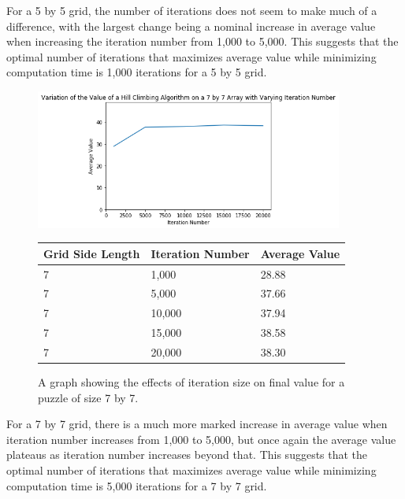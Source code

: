 \documentclass[12pt]{article}
\begin{document}
For a 5 by 5 grid, the number of iterations does not seem to make much of a difference, with the largest change being a nominal increase in average value when increasing the iteration number from 1,000 to 5,000. This suggests that the optimal number of iterations that maximizes average value while minimizing computation time is 1,000 iterations for a 5 by 5 grid.

\begin{figure}[H]
    \centering
    \includegraphics[width=0.9\textwidth]{hill_climbing_7x7_iterations}
\begin{tabular}{ |p{4cm}||p{4cm}|p{4cm}|  }
 \hline
Grid Side Length& Iteration Number &Average Value\\
 \hline
7&1,000&28.88\\
7&5,000&37.66\\
7&10,000&37.94\\
7&15,000&38.58\\
7&20,000&38.30\\
 \hline
\end{tabular}
    \caption{A graph showing the effects of iteration size on final value for a puzzle of size 7 by 7.}
    \label{fig:hill_climbing_7x7_iterations}
\end{figure}

For a 7 by 7 grid, there is a much more marked increase in average value when iteration number increases from 1,000 to 5,000, but once again the average value plateaus as iteration number increases beyond that. This suggests that the optimal number of iterations that maximizes average value while minimizing computation time is 5,000 iterations for a 7 by 7 grid.
\end{document}
